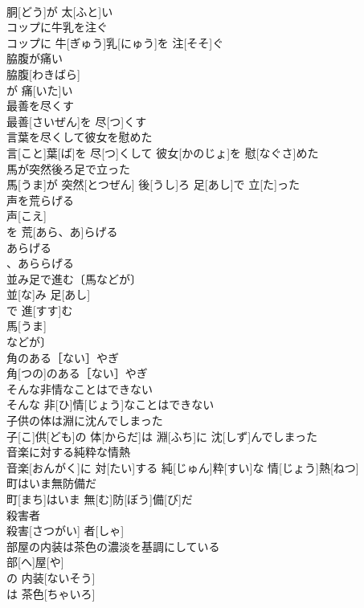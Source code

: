 \documentclass[8pt]{extreport}
\begin{document}
\begin{CJK}{UTF8}{min}
\\	胴[どう]が 太[ふと]い
\\	コップに牛乳を注ぐ	
\\	コップに 牛[ぎゅう]乳[にゅう]を 注[そそ]ぐ
\\	脇腹が痛い	
\\	脇腹[わきばら]
\\	が 痛[いた]い 
\\	最善を尽くす	
\\	最善[さいぜん]を 尽[つ]くす
\\	言葉を尽くして彼女を慰めた	
\\	言[こと]葉[ば]を 尽[つ]くして 彼女[かのじょ]を 慰[なぐさ]めた
\\	馬が突然後ろ足で立った	
\\	馬[うま]が 突然[とつぜん] 後[うし]ろ 足[あし]で 立[た]った
\\	声を荒らげる	
\\	声[こえ]
\\	を 荒[あら、あ]らげる 
\\	あらげる 
\\	、あららげる 
\\	並み足で進む〔馬などが〕	
\\	並[な]み 足[あし]
\\	で 進[すす]む 
\\	馬[うま]
\\	などが〕
\\	角のある［ない］やぎ	
\\	角[つの]のある［ない］やぎ
\\	そんな非情なことはできない	
\\	そんな 非[ひ]情[じょう]なことはできない
\\	子供の体は淵に沈んでしまった	
\\	子[こ]供[ども]の 体[からだ]は 淵[ふち]に 沈[しず]んでしまった
\\	音楽に対する純粋な情熱	
\\	音楽[おんがく]に 対[たい]する 純[じゅん]粋[すい]な 情[じょう]熱[ねつ]
\\	町はいま無防備だ	
\\	町[まち]はいま 無[む]防[ぼう]備[び]だ
\\	殺害者	
\\	殺害[さつがい] 者[しゃ]
\\	部屋の内装は茶色の濃淡を基調にしている	
\\	部[へ]屋[や]
\\	の 内装[ないそう]
\\	は 茶色[ちゃいろ]

\end{CJK}
\end{document}
